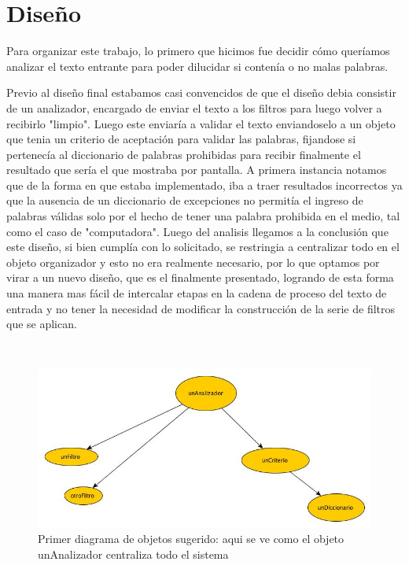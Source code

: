 \section{Diseño}

Para organizar este trabajo, lo primero que hicimos fue decidir cómo queríamos analizar el texto entrante para poder dilucidar si contenía o no malas palabras. 

Previo al diseño final estabamos casi convencidos de que el diseño debia consistir de un analizador, encargado de enviar el texto a los filtros para luego volver a recibirlo "limpio". Luego este enviaría a validar el texto enviandoselo a un objeto que tenia un criterio de aceptación para validar las palabras, fijandose si pertenecía al diccionario de palabras prohibidas para recibir finalmente el resultado que sería el que mostraba por pantalla.
A primera instancia notamos que de la forma en que estaba implementado, iba a traer resultados incorrectos ya que la ausencia de un diccionario de excepciones no permitía el ingreso de palabras válidas solo por el hecho de tener una palabra prohibida en el medio, tal como el caso de "computadora". Luego del analisis llegamos a la conclusión que este diseño, si bien cumplía con lo solicitado, se restringia a centralizar todo en el objeto organizador y esto no era realmente necesario, por lo que optamos por virar a un nuevo diseño, que es el finalmente presentado, logrando de esta forma una manera mas fácil de intercalar etapas en la cadena de proceso del texto de entrada y no tener la necesidad de modificar la construcción de la serie de filtros que se aplican.

\\
\begin{figure}[H]
\centering
\includegraphics[scale=0.4]{../../img/disenoAnterior.jpg}
\caption{Primer diagrama de objetos sugerido: aqui se ve como el objeto unAnalizador centraliza todo el sistema }
\end{figure}
\\

